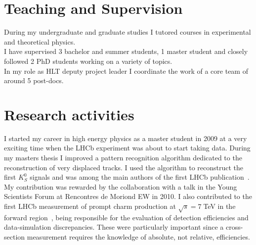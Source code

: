 \documentclass[12pt,a4paper,sans]{moderncv}
\begin{document}
\section{Teaching and Supervision}
During my undergraduate and graduate studies I tutored courses in experimental and theoretical physics.\\
I have supervised 3 bachelor and summer students, 1 master student and closely followed 2 PhD students
working on a variety of topics. \\
In my role as HLT deputy project leader I coordinate the work of a core team of around 5 post-docs. 


\newpage

\section{Research activities}
I started my career in high energy physics as a master student in 2009 at a very exciting time
when the LHCb experiment was about to start taking data. 
During my masters thesis I improved a pattern recognition algorithm dedicated to the 
reconstruction of very displaced tracks. I used the algorithm to reconstruct 
the first $K_S^0$ signals and was among the main authors of the first LHCb publication~\cite{LHCb-PAPER-2010-001}.
My contribution was rewarded by the collaboration with a talk in the Young Scientists Forum at Rencontres de Moriond EW in 2010.  
I also contributed to the first LHCb measurement of prompt charm production at $\sqrt{s}=7\;$TeV in the forward region~\cite{LHCb-PAPER-2012-041},
being responsible for the evaluation of detection efficiencies and data-simulation discrepancies.
These were particularly important since a cross-section measurement requires the knowledge of 
absolute, not relative, efficiencies.
\end{document}
